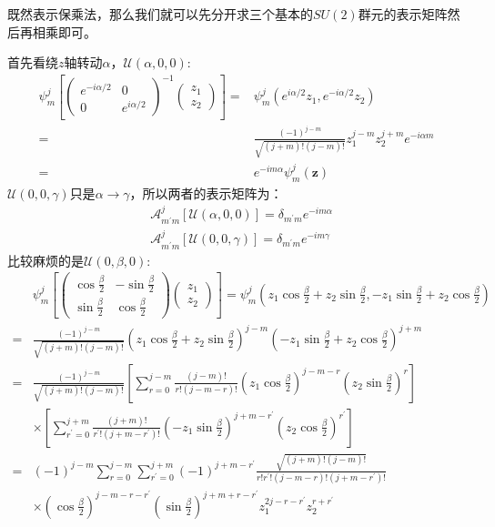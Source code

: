 既然表示保乘法，那么我们就可以先分开求三个基本的$SU(2)$群元的表示矩阵然后再相乘即可。

首先看绕$z$轴转动$\alpha$，$\mathcal{U}(\alpha,0,0)$:
\begin{equation}
	\begin{aligned}
	\psi_m^j\left[\left( {\begin{array}{*{20}{c}}
			{{e^{ - i\alpha /2}}}&0 \\ 
			0&{{e^{i\alpha /2}}} 
	\end{array}} \right)^{-1}\begin{pmatrix}
	z_1\\
	z_2
	\end{pmatrix}\right]=&\psi_m^j\left(e^{i\alpha/2}z_1,e^{-i\alpha/2}z_2\right)\\
	=& \frac{(-1)^{j-m}}{\sqrt{(j+m)!(j-m)!}}z_1^{j-m}z_2^{j+m} e^{-i\alpha m}\\
	=&e^{-im\alpha}\psi_m^j(\mathbf{z})
\end{aligned}
\end{equation}
$\mathcal{U}(0,0,\gamma)$只是$\alpha\to\gamma$，所以两者的表示矩阵为：
\begin{align}
	&\mathcal{A}_{m^\prime m}^j\left[\mathcal{U}(\alpha,0,0)\right]=\delta_{m^\prime m}e^{-im\alpha}\label{eq:D.36}\\
&\mathcal{A}_{m^\prime m}^j\left[\mathcal{U}(0,0,\gamma)\right]=\delta_{m^\prime m}e^{-im\gamma}	\label{eq:D.37}
\end{align}
比较麻烦的是$\mathcal{U}(0,\beta,0)$:
\begin{equation}
	\begin{aligned}
		&\psi_m^j\left[\left( {\begin{array}{*{20}{c}}
				{\cos \frac{\beta }{2}}&{ - \sin \frac{\beta }{2}} \\ 
				{\sin \frac{\beta }{2}}&{\cos \frac{\beta }{2}} 
		\end{array}} \right)\begin{pmatrix}
	z_1\\
z_2
\end{pmatrix}\right]=\psi_m^j\left(z_1\cos\frac{\beta}{2}+z_2\sin\frac{\beta}{2},-z_1\sin\frac{\beta}{2}+z_2\cos\frac{\beta}{2}\right)\\
=&\frac{(-1)^{j-m}}{\sqrt{(j+m)!(j-m)!}}\left(z_1\cos\frac{\beta}{2}+z_2\sin\frac{\beta}{2}\right)^{j-m}\left(-z_1\sin\frac{\beta}{2}+z_2\cos\frac{\beta}{2}\right)^{j+m}
\\
=&
\frac{(-1)^{j-m}}{\sqrt{(j+m)!(j-m)!}}\left[\sum_{r=0}^{j-m}\frac{(j-m)!}{r!(j-m-r)!}\left(z_1\cos\frac{\beta}{2}\right)^{j-m-r}\left(z_2\sin\frac{\beta}{2}\right)^r\right]\\
&\times\left[\sum_{r^\prime=0}^{j+m}\frac{(j+m)!}{r^\prime!(j+m-r^\prime)!}\left(-z_1\sin\frac{\beta}{2}\right)^{j+m-r^\prime}\left(z_2\cos\frac{\beta}{2}\right)^{r^\prime}\right]\\
=&(-1)^{j-m}\sum_{r=0}^{j-m}\sum_{r^\prime=0}^{j+m}(-1)^{j+m-r^\prime}\frac{\sqrt{(j+m)!(j-m)!}}{r!r^\prime!(j-m-r)!(j+m-r^\prime)!}\\
&\times\left(\cos\frac{\beta}{2}\right)^{j-m-r-r^\prime}\left(\sin\frac{\beta}{2}\right)^{j+m+r-r^\prime}z_1^{2j-r-r^\prime}z_2^{r+r^\prime}
	\end{aligned}
\end{equation}
